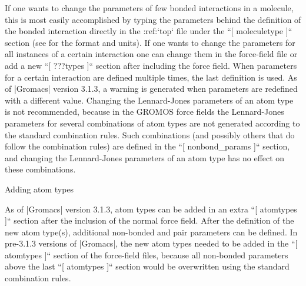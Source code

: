 If one wants to change the parameters of few bonded interactions in a
molecule, this is most easily accomplished by typing the parameters
behind the definition of the bonded interaction directly in the
:ref:`top` file under the ``[ moleculetype ]``
section (see 
for the format and
units). If one wants to change the parameters for all instances of a
certain interaction one can change them in the force-field file or add a
new ``[ ???types ]`` section after including the force
field. When parameters for a certain interaction are defined multiple
times, the last definition is used. As of |Gromacs| version 3.1.3, a
warning is generated when parameters are redefined with a different
value. Changing the Lennard-Jones parameters of an atom type is not
recommended, because in the GROMOS force fields the Lennard-Jones
parameters for several combinations of atom types are not generated
according to the standard combination rules. Such combinations (and
possibly others that do follow the combination rules) are defined in the
``[ nonbond_params ]`` section, and changing the
Lennard-Jones parameters of an atom type has no effect on these
combinations.

Adding atom types
~~~~~~~~~~~~~~~~~

As of |Gromacs| version 3.1.3, atom types can be added in an extra
``[ atomtypes ]`` section after the inclusion of the
normal force field. After the definition of the new atom type(s),
additional non-bonded and pair parameters can be defined. In pre-3.1.3
versions of |Gromacs|, the new atom types needed to be added in the
``[ atomtypes ]`` section of the force-field files, because
all non-bonded parameters above the last ``[ atomtypes ]``
section would be overwritten using the standard combination rules.
